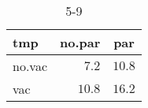 %
\begin{table}[!tbp]
\caption{5-9\label{5-9}} 
\begin{center}
\begin{tabular}{lrr}
\hline\hline
\multicolumn{1}{l}{tmp}&\multicolumn{1}{c}{no.par}&\multicolumn{1}{c}{par}\tabularnewline
\hline
no.vac&$ 7.2$&$10.8$\tabularnewline
vac&$10.8$&$16.2$\tabularnewline
\hline
\end{tabular}
\end{center}
\end{table}

